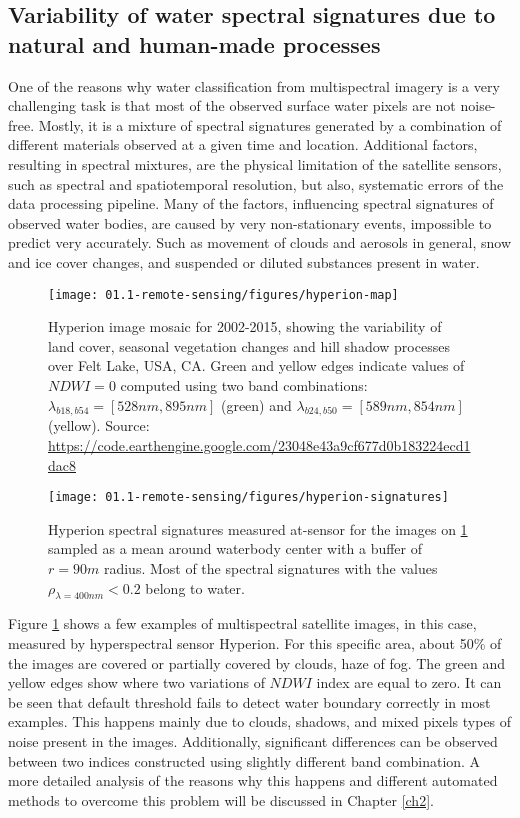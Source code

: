 \subsection{Variability of water spectral signatures due to natural and human-made processes}

One of the reasons why water classification from multispectral imagery is a very challenging task is that most of the observed surface water pixels are not noise-free. Mostly, it is a mixture of spectral signatures generated by a combination of different materials observed at a given time and location. Additional factors, resulting in spectral mixtures, are the physical limitation of the satellite sensors, such as spectral and spatiotemporal resolution, but also, systematic errors of the data processing pipeline. Many of the factors, influencing spectral signatures of observed water bodies, are caused by very non-stationary events, impossible to predict very accurately. Such as movement of clouds and aerosols in general, snow and ice cover changes, and suspended or diluted substances present in water. 

\begin{figure}
	\texttt{[image: 01.1-remote-sensing/figures/hyperion-map]}
	\caption{Hyperion image mosaic for 2002-2015, showing the variability of land cover, seasonal vegetation changes and hill shadow processes over Felt Lake, USA, CA. Green and yellow edges indicate values of $NDWI=0$ computed using two band combinations: $\lambda_{b18, b54} = [528nm, 895nm]$ (green) and $\lambda_{b24, b50} = [589nm, 854nm]$ (yellow).
	Source: \url{https://code.earthengine.google.com/23048e43a9cf677d0b183224ecd1dac8}} 
	\label{fig:intro-hyperion-example}
	
\end{figure}

\begin{figure}
	\texttt{[image: 01.1-remote-sensing/figures/hyperion-signatures]}
	\caption{Hyperion spectral signatures measured at-sensor for the images on \ref{fig:intro-hyperion-example} sampled as a mean around waterbody center with a buffer of $r=90m$ radius. Most of the spectral signatures with the values $\rho_{\lambda = 400nm} < 0.2$ belong to water.} 
	\label{fig:intro-hyperion-example-signatures}
\end{figure}

Figure \ref{fig:intro-hyperion-example} shows a few examples of multispectral satellite images, in this case, measured by hyperspectral sensor Hyperion. For this specific area, about 50\% of the images are covered or partially covered by clouds, haze of fog. The green and yellow edges show where two variations of $NDWI$ index are equal to zero. It can be seen that default threshold fails to detect water boundary correctly in most examples. This happens mainly due to clouds, shadows, and mixed pixels types of noise present in the images. Additionally, significant differences can be observed between two indices constructed using slightly different band combination. A more detailed analysis of the reasons why this happens and different automated methods to overcome this problem will be discussed in Chapter \ref{ch2}.

